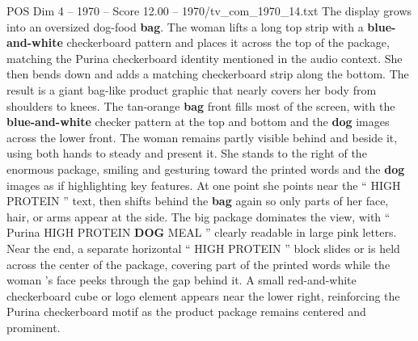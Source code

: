 \begin{textsample}{POS Dim 4 – 1970 – Score 12.00 – 1970/tv\_com\_1970\_14.txt}
The display grows into an oversized dog-food \textbf{bag}.
The woman lifts a long top strip with a \textbf{blue-and-white} checkerboard pattern and places it across the top of the package, matching the Purina checkerboard identity mentioned in the audio context.
She then bends down and adds a matching checkerboard strip along the bottom.
The result is a giant bag-like product graphic that nearly covers her body from shoulders to knees.
The tan-orange \textbf{bag} front fills most of the screen, with the \textbf{blue-and-white} checker pattern at the top and bottom and the \textbf{dog} images across the lower front.
The woman remains partly visible behind and beside it, using both hands to steady and present it.
She stands to the right of the enormous package, smiling and gesturing toward the printed words and the \textbf{dog} images as if highlighting key features.
At one point she points near the “ HIGH PROTEIN ” text, then shifts behind the \textbf{bag} again so only parts of her face, hair, or arms appear at the side.
The big package dominates the view, with “ Purina HIGH PROTEIN \textbf{DOG} MEAL ” clearly readable in large pink letters.
Near the end, a separate horizontal “ HIGH PROTEIN ” block slides or is held across the center of the package, covering part of the printed words while the woman ’s face peeks through the gap behind it.
A small red-and-white checkerboard cube or logo element appears near the lower right, reinforcing the Purina checkerboard motif as the product package remains centered and prominent.

\end{textsample}
